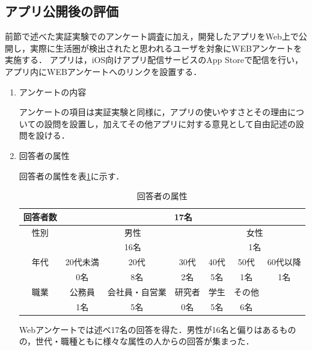 \documentclass[a4paper]{jsarticle}
\begin{document}
\begin{enumerate}
\subsection{アプリ公開後の評価}
前節で述べた実証実験でのアンケート調査に加え，開発したアプリをWeb上で公開し，実際に生活圏が検出されたと思われるユーザを対象にWEBアンケートを実施する．
アプリは，iOS向けアプリ配信サービスのApp Storeで配信を行い，アプリ内にWEBアンケートへのリンクを設置する．

  \begin{enumerate}
    \item アンケートの内容

    アンケートの項目は実証実験と同様に，アプリの使いやすさとその理由についての設問を設置し，加えてその他アプリに対する意見として自由記述の設問を設ける．

    \item 回答者の属性

    回答者の属性を表\ref{tab:mbn-userstatus}に示す．


    \begin{table}[H]
      \begin{center}
        \caption{回答者の属性}
        \renewcommand\arraystretch{1.4}
        \begin{tabular}{|c|c|c|c|c|c|c|}
          \hline
          \multicolumn{1}{|l|}{回答者数} & \multicolumn{6}{c|}{17名} \\
          \hline
          性別 & \multicolumn{3}{c|}{男性}　& \multicolumn{3}{c|}{女性} \\
          \cline{2-7}
          & \multicolumn{3}{c|}{16名}　& \multicolumn{3}{c|}{1名} \\
          \hline
          年代 & 20代未満 & 20代 & 30代 & 40代 & 50代 & 60代以降 \\
          \cline{2-7}
          & 0名 & 8名 & 2名 & 5名 & 1名 & 1名 \\
          \hline
          職業 & 公務員 & 会社員・自営業 & 研究者 & 学生 & その他 &  \\
          \cline{2-7}
          & 1名 & 5名 & 0名 & 5名 & 6名 & \\
          \hline
        \end{tabular}
        \label{tab:mbn-userstatus}
      \end{center}
    \end{table}

    Webアンケートでは述べ17名の回答を得た．男性が16名と偏りはあるものの，世代・職種ともに様々な属性の人からの回答が集まった．


\end{enumerate}
\end{enumerate}
\end{document}
